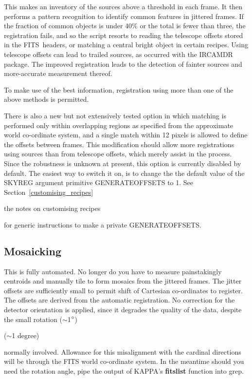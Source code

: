 \documentclass[twoside,11pt]{article}
\newcommand{\htmladdnormallink}[2]{#1}
\newcommand{\htmlref}[2]{#1}
\newenvironment{latexonly}{}{}
\newcommand{\xref}[3]{#1}
\newcommand{\xlabel}[1]{}
\renewcommand{\_}{\texttt{\symbol{95}}}
\newcommand{\dgs}{\hbox{$^\circ$}}
\newcommand{\dgs}{{\rawhtml &deg;}}
\newcommand{\FITSref}{\htmladdnormallink{FITS}{http://fits.gsfc.nasa.gov/}}
\begin{document}
This makes an inventory of the sources above a threshold in each
frame.  It then performs a \xref{pattern
recognition}{sun139}{mosaicing} to identify common features in
jittered frames.  If the fraction of common objects is under 40\% or
the total is fewer than three, the registration fails, and so the
script resorts to reading the telescope offsets stored in the
\FITSref\ headers, or matching a central bright object in certain
recipes.  Using telescope offsets can lead to trailed sources, as
occurred with the \xref{{\footnotesize IRCAMDR} package}{sun41}{}. The
improved registration leads to the detection of fainter sources and
more-accurate measurement thereof.

To make use of the best information, registration using more than one
of the above methods is permitted.

There is also a new but not extensively tested option in which
matching is performed only within overlapping regions as specified
from the approximate world co-ordinate system, and a single match
within 12 pixels is allowed to define the offsets between frames. This
modification should allow more registrations using sources than from
telescope offsets, which merely assist in the process.  Since the
robustness is unknown at present, this option is currently disabled by
default.  The easiest way to switch it on, is to change the 
the default value of the SKYREG argument primitive \_GENERATE\_OFFSETS\_
to 1.  See
\begin{latexonly}
Section~\ref{customising_recipes}
\end{latexonly}
\begin{htmlonly}
the notes on 
\htmlref{customising recipes}{customising_recipes}
\end{htmlonly}
for generic instructions to make a private \_GENERATE\_OFFSETS\_.

\subsection{\xlabel{mosaicking}Mosaicking\label{mosaicking}}

This is fully automated.  No longer do you have to measure
painstakingly centroids and manually tile to form mosaics from the
jittered frames.  The jitter offsets are sufficiently small to permit
shift of Cartesian co-ordinates to register.  The offsets are derived
from the automatic registration.  No correction for the detector
orientation is applied, since it degrades the quality of the data,
despite the small rotation 
\begin{latexonly}
($\sim$1$\dgs$)
\end{latexonly}
\begin{htmlonly}
($\sim$1 degree)
\end{htmlonly}
normally involved.  Allowance for this misalignment with the cardinal
directions will be through the \htmladdnormallink{FITS world co-ordinate
system}{http://fits.gsfc.nasa.gov/documents.html#WCS}. In the meantime
should you need the rotation angle, pipe the output of KAPPA's
\xref{{\bf fitslist}}{sun95}{FITSLIST} function into grep.
\end{document}
